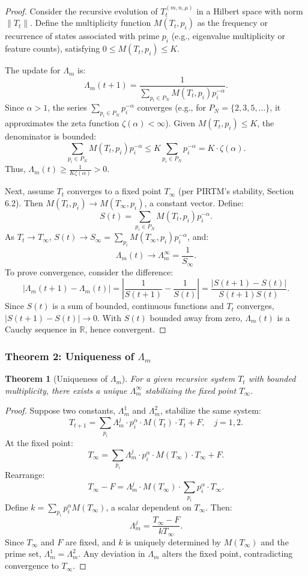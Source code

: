 \documentclass[12pt]{article}
\newtheorem{theorem}{Theorem}[section]
\begin{document}
\begin{proof}
Consider the recursive evolution of \( T_t^{(m, n, \mu)} \) in a Hilbert space with norm \( \| T_t \| \). Define the multiplicity function \( M(T_t, p_i) \) as the frequency or recurrence of states associated with prime \( p_i \) (e.g., eigenvalue multiplicity or feature counts), satisfying \( 0 \leq M(T_t, p_i) \leq K \).

The update for \(\Lambda_m\) is:
\[
\Lambda_m(t+1) = \frac{1}{\sum_{p_i \in P_N} M(T_t, p_i) p_i^{-\alpha}}.
\]
Since \(\alpha > 1\), the series \(\sum_{p_i \in P_N} p_i^{-\alpha}\) converges (e.g., for \( P_N = \{2, 3, 5, \ldots\} \), it approximates the zeta function \(\zeta(\alpha) < \infty\)). Given \( M(T_t, p_i) \leq K \), the denominator is bounded:
\[
\sum_{p_i \in P_N} M(T_t, p_i) p_i^{-\alpha} \leq K \sum_{p_i \in P_N} p_i^{-\alpha} = K \cdot \zeta(\alpha).
\]
Thus, \(\Lambda_m(t) \geq \frac{1}{K \zeta(\alpha)} > 0\).

Next, assume \( T_t \) converges to a fixed point \( T_\infty \) (per PIRTM’s stability, Section 6.2). Then \( M(T_t, p_i) \to M(T_\infty, p_i) \), a constant vector. Define:
\[
S(t) = \sum_{p_i \in P_N} M(T_t, p_i) p_i^{-\alpha}.
\]
As \( T_t \to T_\infty \), \( S(t) \to S_\infty = \sum_{p_i} M(T_\infty, p_i) p_i^{-\alpha} \), and:
\[
\Lambda_m(t) \to \Lambda_m^\infty = \frac{1}{S_\infty}.
\]
To prove convergence, consider the difference:
\[
|\Lambda_m(t+1) - \Lambda_m(t)| = \left| \frac{1}{S(t+1)} - \frac{1}{S(t)} \right| = \frac{|S(t+1) - S(t)|}{S(t+1) S(t)}.
\]
Since \( S(t) \) is a sum of bounded, continuous functions and \( T_t \) converges, \( |S(t+1) - S(t)| \to 0 \). With \( S(t) \) bounded away from zero, \(\Lambda_m(t)\) is a Cauchy sequence in \(\mathbb{R}\), hence convergent.
\end{proof}

\subsubsection{Theorem 2: Uniqueness of \(\Lambda_m\)}
\begin{theorem}[Uniqueness of \(\Lambda_m\)]
For a given recursive system \( T_t \) with bounded multiplicity, there exists a unique \(\Lambda_m^\infty\) stabilizing the fixed point \( T_\infty \).
\end{theorem}

\begin{proof}
Suppose two constants, \(\Lambda_m^1\) and \(\Lambda_m^2\), stabilize the same system:
\[
T_{t+1} = \sum_{p_i} \Lambda_m^j \cdot p_i^\alpha \cdot M(T_t) \cdot T_t + F, \quad j = 1, 2.
\]
At the fixed point:
\[
T_\infty = \sum_{p_i} \Lambda_m^j \cdot p_i^\alpha \cdot M(T_\infty) \cdot T_\infty + F.
\]
Rearrange:
\[
T_\infty - F = \Lambda_m^j \cdot M(T_\infty) \cdot \sum_{p_i} p_i^\alpha \cdot T_\infty.
\]
Define \( k = \sum_{p_i} p_i^\alpha M(T_\infty) \), a scalar dependent on \( T_\infty \). Then:
\[
\Lambda_m^j = \frac{T_\infty - F}{k T_\infty}.
\]
Since \( T_\infty \) and \( F \) are fixed, and \( k \) is uniquely determined by \( M(T_\infty) \) and the prime set, \(\Lambda_m^1 = \Lambda_m^2\). Any deviation in \(\Lambda_m\) alters the fixed point, contradicting convergence to \( T_\infty \).
\end{proof}
\end{document}
